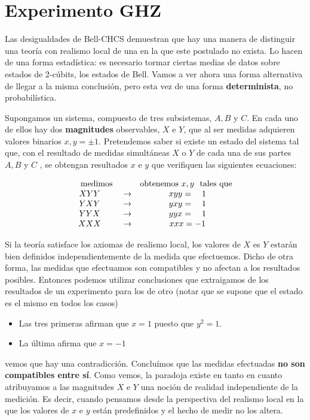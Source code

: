 \documentclass[a4paper,11pt]{book} %
\numberwithin{equation}{chapter}
\begin{document}
    \section{Experimento GHZ}

Las desigualdades de Bell-CHCS demuestran que hay una manera de distinguir una teoría con  realismo local de una en la que este postulado no  exista. Lo hacen de una forma estadística: es necesario tormar ciertas medias de datos sobre estados de 2-cúbits, los  estados de Bell. Vamos a ver ahora una forma alternativa de llegar a la misma conclusión, pero esta vez de una forma \textbf{determinista}, no probabilística.

Supongamos un sistema, compuesto de  tres subsistemas, $A, B$ y $C$. En cada uno de ellos hay dos \textbf{magnitudes} observables, $X$ e $Y$, que al ser medidas adquieren valores binarios $x, y = \pm 1$. Pretendemos saber si existe un estado del sistema tal que, con el resultado  de  medidas simultáneas $X$ o $Y$ de cada una de sus partes $A,B$ y $C$ , se obtengan resultados $x$ e $y$ que verifiquen las siguientes ecuaciones:

\begin{equation}
\begin{array}{ccc}
{\rm medimos} & & \hbox{obtenemos} ~ x,y ~~ \hbox{tales que} \\
XYY ~~~~~ &\to& ~xyy =~~~ 1\nonumber\\
YXY ~~~~~ &\to& ~yxy =~~~ 1 \\
YYX ~~~~~ &\to& ~yyx =~~~ 1\nonumber\\
XXX ~~~~~ &\to& ~xxx = -1\nonumber
\end{array}
\end{equation}

Si la teoría satisface los axiomas de realismo local,  los valores de $X$ es $Y$ estarán bien definidos independientemente de la medida que efectuemos. Dicho de otra forma, las medidas que efectuamos son compatibles y no afectan a los resultados posibles. Entonces podemos utilizar conclusiones que extraigamos de los resultados de un experimento para los de otro (notar que se supone que el estado es el mismo en todos los casos)
\begin{itemize}
	\item Las tres primeras afirman que $x=1$ puesto que $y^2=1$. 
	\item La última afirma que $x=-1$
\end{itemize}
vemos que hay una contradicción. Concluímos que las medidas efectuadas \textbf{no son compatibles entre sí}. Como vemos, la paradoja existe en tanto en cuanto atribuyamos a las magnitudes $X$ e $Y$ una noción de realidad  independiente de la medición. Es decir, cuando pensamos desde la perspectiva del realismo local en la que los valores de $x$ e $y$ están predefinidos y el hecho de medir no los altera. 
\end{document}
